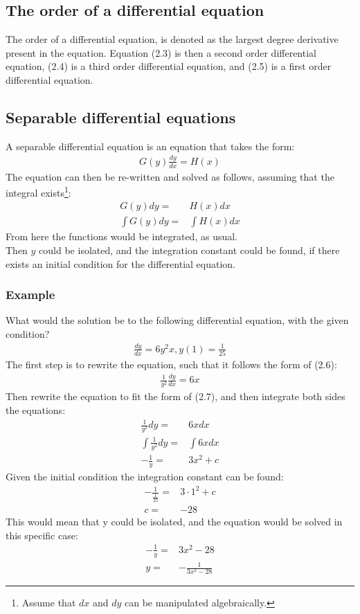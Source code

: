 \subsection{The order of a differential equation}
The order of a differential equation, is denoted as the largest degree derivative present in the equation. Equation (2.3) is then a second order differential equation, (2.4) is a third order differential equation, and (2.5) is a first order differential equation.

\subsection{Separable differential equations}
A separable differential equation is an equation that takes the form:
\begin{align}
	G(y)\frac{dy}{dx}=H(x)
\end{align}
The equation can then be re-written and solved as follows, assuming that the integral exists\footnote{Assume that $dx$ and $dy$ can be manipulated algebraically. }:
\begin{align}
	G(y)dy=&H(x)dx				\\
	\int G(y)dy =& \int H(x)dx
\end{align}
From here the functions would be integrated, as usual.\\
Then $y$ could be isolated, and the integration constant could be found, if there exists an initial condition for the differential equation.
\subsubsection{Example}
What would the solution be to the following differential equation, with the given condition?
\begin{align*}
	\frac{dy}{dx} = 6y^2x, y(1)=\frac{1}{25}
\end{align*}
The first step is to rewrite the equation, such that it follows the form of (2.6):
\begin{align*}
	\frac{1}{y^2}\frac{dy}{dx}=6x
\end{align*}
Then rewrite the equation to fit the form of (2.7), and then integrate both sides the equations:
\begin{align*}
	\frac{1}{y^2}dy=&6x dx				\\
	\int \frac{1}{y^2}dy=&\int 6x dx		\\
	-\frac{1}{y}=&3x^2+c		
\end{align*}
Given the initial condition the integration constant can be found:
\begin{align*}
	-\frac{1}{\frac{1}{25}}=&3\cdot 1^2+c	\\
	c=&-28
\end{align*}
This would mean that y could be isolated, and the equation would be solved in this specific case:
\begin{align*}
	-\frac{1}{y}=&3x^2-28\\
	y=&-\frac{1}{3x^2-28}
\end{align*}